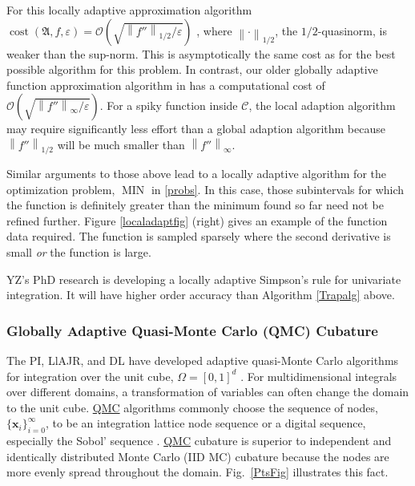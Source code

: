 \documentclass[11pt]{NSFamsart}
\newcommand{\QMC}{\hyperlink{QMClink}{QMC}\xspace}
\DeclareMathOperator{\cost}{cost}
\DeclareMathOperator{\OPT}{MIN}
\newcommand{\bx}{{\boldsymbol{x}}}
\newcommand{\cc}{\mathcal{C}}
\newcommand{\fA}{\mathfrak{A}}
\newcommand{\norm}[2][{}]{\ensuremath{\left \lVert #2 \right \rVert}_{#1}}
\newcommand{\Order}{\mathcal{O}}
\begin{document}
For this locally adaptive approximation algorithm 
$\cost(\fA,f,\varepsilon) = \Order\left(\sqrt{\norm[1/2]{f''}/\varepsilon} \right)$ \cite{ChoEtal17a}, 
where 
$\norm[1/2]{\cdot}$, the $1/2$-quasinorm, is weaker than the sup-norm.  This is  
asymptotically the same cost as for the best possible algorithm for this problem. In contrast, 
our older globally adaptive function approximation algorithm in \cite{HicEtal14b} has a 
computational cost of $\Order\left(\sqrt{\norm[\infty]{f''}/\varepsilon} \right)$.  For a spiky 
function inside $\cc$, the local adaption algorithm may require significantly less effort 
than a global adaption algorithm because $\norm[1/2]{f''}$ will be much smaller than 
$\norm[\infty]{f''}$.

Similar arguments to those above lead to a locally adaptive algorithm for the 
optimization problem, $\OPT$ in \eqref{probs}.  In this case, those subintervals for which the 
function is definitely greater than the minimum found so far need not be 
refined further.  Figure 
\ref{localadaptfig} (right) gives an example of the function data required.  The function is 
sampled sparsely where the second derivative is small \emph{or} the function is large.

YZ's PhD research is developing a locally 
adaptive Simpson's rule for univariate integration.  It will have higher order accuracy than Algorithm 
\ref{Trapalg} above.  

\subsubsection[QMCsec]{Globally  Adaptive Quasi-Monte Carlo (QMC) 
Cubature} \hypertarget{QMClink}{}
\label{QMCsec}
The PI, LlAJR, and DL 
have 
developed adaptive quasi-Monte Carlo algorithms for integration over the unit cube, $\Omega = 
[0,1]^d$ \cite{HicJim16a,JimHic16a}.  For multidimensional integrals over different domains, a 
transformation of variables can 
often change the domain to the unit cube.  \QMC algorithms  commonly 
choose the 
sequence of nodes, $\{\bx_i\}_{i=0}^\infty$, to be an integration lattice node sequence  or a digital 
sequence, especially the Sobol' sequence \cite{DicEtal14a}.  \QMC cubature is superior to 
independent and identically distributed Monte Carlo (\hypertarget{IIDMClink}{IID MC}) cubature 
because the nodes are more 
evenly spread throughout the domain.   Fig.\ \ref{PtsFig} illustrates this fact.
\end{document}
